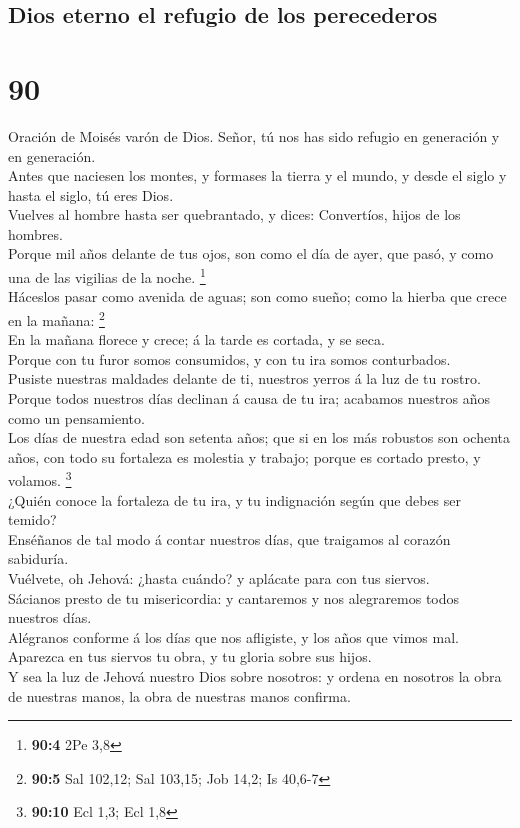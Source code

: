 \hypertarget{dios-eterno-el-refugio-de-los-perecederos}{%
\subsection{Dios eterno el refugio de los
perecederos}\label{dios-eterno-el-refugio-de-los-perecederos}}

\hypertarget{section-89}{%
\section{90}\label{section-89}}

 Oración de Moisés varón de Dios. Señor, tú nos has sido
refugio en generación y en generación.\\
 Antes que naciesen los montes, y formases la tierra y el
mundo, y desde el siglo y hasta el siglo, tú eres Dios.\\
 Vuelves al hombre hasta ser quebrantado, y dices:
Convertíos, hijos de los hombres.\\
 Porque mil años delante de tus ojos, son como el día de
ayer, que pasó, y como una de las vigilias de la noche. \footnote{\textbf{90:4}
  2Pe 3,8}\\
 Háceslos pasar como avenida de aguas; son como sueño;
como la hierba que crece en la mañana: \footnote{\textbf{90:5} Sal
  102,12; Sal 103,15; Job 14,2; Is 40,6-7}\\
 En la mañana florece y crece; á la tarde es cortada, y se
seca.\\
 Porque con tu furor somos consumidos, y con tu ira somos
conturbados.\\
 Pusiste nuestras maldades delante de ti, nuestros yerros
á la luz de tu rostro.\\
 Porque todos nuestros días declinan á causa de tu ira;
acabamos nuestros años como un pensamiento.\\
 Los días de nuestra edad son setenta años; que si en los
más robustos son ochenta años, con todo su fortaleza es molestia y
trabajo; porque es cortado presto, y volamos. \footnote{\textbf{90:10}
  Ecl 1,3; Ecl 1,8}\\
 ¿Quién conoce la fortaleza de tu ira, y tu indignación
según que debes ser temido?\\
 Enséñanos de tal modo á contar nuestros días, que
traigamos al corazón sabiduría.\\
 Vuélvete, oh Jehová: ¿hasta cuándo? y aplácate para con
tus siervos.\\
 Sácianos presto de tu misericordia: y cantaremos y nos
alegraremos todos nuestros días.\\
 Alégranos conforme á los días que nos afligiste, y los
años que vimos mal.\\
 Aparezca en tus siervos tu obra, y tu gloria sobre sus
hijos.\\
 Y sea la luz de Jehová nuestro Dios sobre nosotros: y
ordena en nosotros la obra de nuestras manos, la obra de nuestras manos
confirma.

